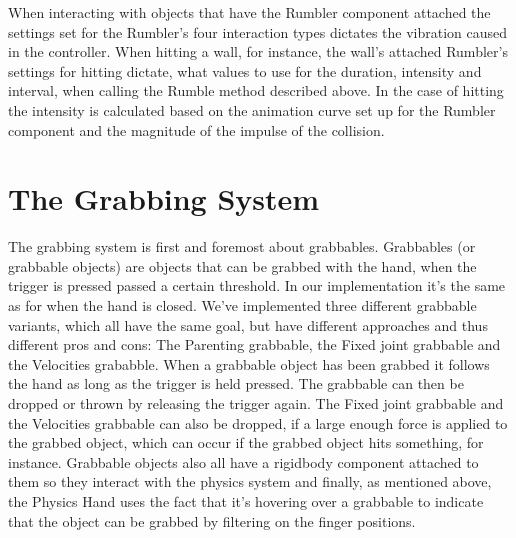 When interacting with objects that have the Rumbler component attached the settings set for the Rumbler's four interaction types dictates the vibration caused in the controller. When hitting a wall, for instance, the wall's attached Rumbler's settings for hitting dictate, what values to use for the duration, intensity and interval, when calling the Rumble method described above. In the case of hitting the intensity is calculated based on the animation curve set up for the Rumbler component and the magnitude of the impulse of the collision.




\section{The Grabbing System}
\label{sec:grabbingSystem}
The grabbing system is first and foremost about grabbables. Grabbables (or grabbable objects) are objects that can be grabbed with the hand, when the trigger is pressed passed a certain threshold. In our implementation it's the same as for when the hand is closed. We've implemented three different grabbable variants, which all have the same goal, but have different approaches and thus different pros and cons: The Parenting grabbable, the Fixed joint grabbable and the Velocities grababble. When a grabbable object has been grabbed it follows the hand as long as the trigger is held pressed. The grabbable can then be dropped or thrown by releasing the trigger again. The Fixed joint grabbable and the Velocities grabbable can also be dropped, if a large enough force is applied to the grabbed object, which can occur if the grabbed object hits something, for instance. Grabbable objects also all have a rigidbody component attached to them so they interact with the physics system and finally, as mentioned above, the Physics Hand uses the fact that it's hovering over a grabbable to indicate that the object can be grabbed by filtering on the finger positions.

